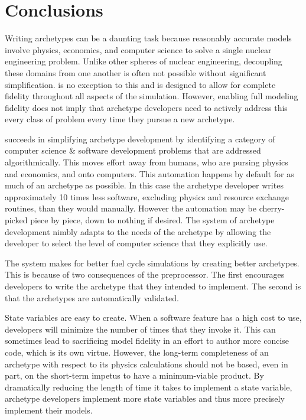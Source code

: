 \section{Conclusions}
\label{sec-conc}

Writing archetypes can be a daunting task because reasonably accurate models 
involve physics, economics, and computer science to solve a single nuclear engineering 
problem.  Unlike other spheres of nuclear engineering, decoupling these domains from
one another is often not possible without significant simplification. \cyclus is 
no exception to this and is designed to allow for complete fidelity throughout 
all aspects of the simulation. However, enabling full modeling fidelity does
not imply that archetype developers need to actively address this every class of 
problem every time they pursue a new archetype.

\Cyclus succeeds in simplifying archetype development by identifying a category 
of computer science \& software development problems that are addressed 
algorithmically. This moves effort away from humans, who are pursing physics and
economics, and onto computers. This automation happens by default for as much of
an archetype as possible. In this case the archetype developer writes approximately
10 times less software, excluding physics and resource exchange routines, than
they would manually. However the automation may be cherry-picked piece by piece,
down to nothing if desired. The \cyclus system of archetype development nimbly 
adapts to the needs of the archetype by allowing the developer to select the 
level of computer science that they explicitly use.  

The \cyclus system makes for better fuel cycle simulations by creating better 
archetypes.  This is because of two consequences of the preprocessor. The first 
\cyclus encourages developers to write the archetype
that they intended to implement. The second is that the archetypes are automatically
validated.

State variables are easy to create. When a software feature has a high cost to use,
developers will minimize the number of times that they invoke it. This can 
sometimes lead to sacrificing model fidelity in an effort to author more concise
code, which is its own virtue. However, the long-term completeness of an archetype
with respect to its physics calculations should not be based, even in part, on the
short-term impetus to have a minimum-viable product. By dramatically reducing the 
length of time it takes to implement a state variable, archetype developers implement
more state variables and thus more precisely implement their models.

